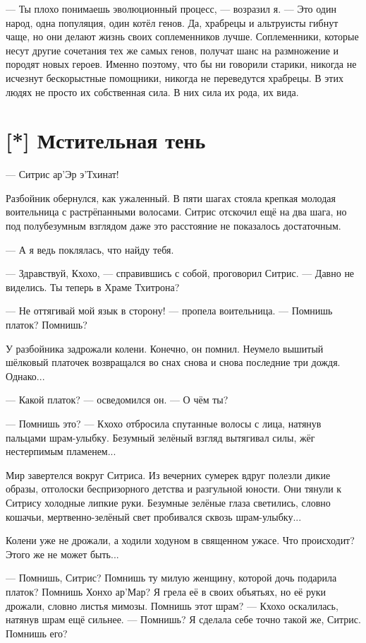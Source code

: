--- Ты плохо понимаешь эволюционный процесс, --- возразил я.
--- Это один народ, одна популяция, один котёл генов.
Да, храбрецы и альтруисты гибнут чаще, но они делают жизнь своих соплеменников лучше.
Соплеменники, которые несут другие сочетания тех же самых генов, получат шанс на размножение и породят новых героев.
Именно поэтому, что бы ни говорили старики, никогда не исчезнут бескорыстные помощники, никогда не переведутся храбрецы.
В этих людях не просто их собственная сила.
В них сила их рода, их вида.

\section{[*] Мстительная тень}

--- Ситрис ар'Эр э'Тхинат!

Разбойник обернулся, как ужаленный.
В пяти шагах стояла крепкая молодая воительница с растрёпанными волосами.
Ситрис отскочил ещё на два шага, но под полубезумным взглядом даже это расстояние не показалось достаточным.

--- А я ведь поклялась, что найду тебя.

--- Здравствуй, Кхохо, --- справившись с собой, проговорил Ситрис.
--- Давно не виделись.
Ты теперь в Храме Тхитрона?

--- Не оттягивай мой язык в сторону! --- пропела воительница.
--- Помнишь платок?
Помнишь?

У разбойника задрожали колени.
Конечно, он помнил.
Неумело вышитый шёлковый платочек возвращался во снах снова и снова последние три дождя.
Однако...

--- Какой платок? --- осведомился он.
--- О чём ты?

--- Помнишь это? --- Кхохо отбросила спутанные волосы с лица, натянув пальцами шрам-улыбку.
Безумный зелёный взгляд вытягивал силы, жёг нестерпимым пламенем...

Мир завертелся вокруг Ситриса.
Из вечерних сумерек вдруг полезли дикие образы, отголоски беспризорного детства и разгульной юности.
Они тянули к Ситрису холодные липкие руки.
Безумные зелёные глаза светились, словно кошачьи, мертвенно-зелёный свет пробивался сквозь шрам-улыбку...

Колени уже не дрожали, а ходили ходуном в священном ужасе.
Что происходит?
Этого же не может быть...

--- Помнишь, Ситрис?
Помнишь ту милую женщину, которой дочь подарила платок?
Помнишь Хонхо ар'Мар?
Я грела её в своих объятьях, но её руки дрожали, словно листья мимозы.
Помнишь этот шрам? --- Кхохо оскалилась, натянув шрам ещё сильнее.
--- Помнишь?
Я сделала себе точно такой же, Ситрис.
Помнишь его?


